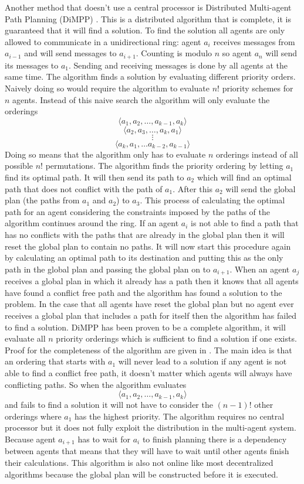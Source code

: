 Another method that doesn't use a central processor is Distributed Multi-agent
Path Planning (DiMPP) \cite{chouhan2017}. This is a distributed algorithm that
is complete, it is guaranteed that it will find a solution. To find the
solution all agents are only allowed to communicate in a unidirectional ring:
agent $a_i$ receives messages from $a_{i-1}$ and will send messages to
$a_{i+1}$. Counting is modulo $n$ so agent $a_n$ will send its messages to
$a_1$. Sending and receiving messages is done by all agents at the same time.
The algorithm finds a solution by evaluating different priority orders. Naively
doing so would require the algorithm to evaluate $n!$ priority schemes for $n$
agents. Instead of this naive search the algorithm will only evaluate the
orderings
\[ \langle a_1, a_2, \ldots, a_{k-1}, a_k \rangle \]
\[ \langle a_2, a_3, \ldots, a_k, a_1 \rangle \]
\[ \vdots \]
\[ \langle a_k, a_1, \ldots a_{k-2}, a_{k-1} \rangle \]
Doing so means that the algorithm only has to evaluate $n$ orderings instead of
all possible $n!$ permutations. The algorithm finds the priority ordering
by letting $a_1$ find its optimal path. It will then send its path to $a_2$
which will find an optimal path that does not conflict with the path of $a_1$.
After this $a_2$ will send the global plan (the paths from $a_1$ and $a_2$) to
$a_3$. This process of calculating the optimal path for an agent considering
the constraints imposed by the paths of the algorithm continues around the
ring. If an agent $a_i$ is not able to find a path that has no conflicts with
the paths that are already in the global plan then it will reset the global
plan to contain no
paths. It will now start this procedure again by calculating an optimal path to
its destination and putting this as the only path in the global plan and
passing the global plan on to $a_{i+1}$. When an agent $a_j$ receives a global
plan in which it already has a path then it knows that all agents have found a
conflict free path and the algorithm has found a solution to the problem. In
the case that all agents have reset the global plan but no agent ever receives
a global plan that includes a path for itself then the algorithm has failed to
find a solution. DiMPP has been proven to be a complete algorithm, it will
evaluate all $n$ priority orderings which is sufficient to find a solution if
one exists. Proof for the completeness of the algorithm are given in
\cite[subsection 5.1]{chouhan2017}. The main idea is that an ordering that
starts with $a_1$ will never lead to a solution if any agent is not able to
find a conflict free path, it doesn't matter which agents will always have
conflicting paths. So when the algorithm evaluates
\[ \langle a_1, a_2, \ldots, a_{k-1}, a_k \rangle \]
and fails to find a solution it will not have to
consider the $(n-1)!$ other orderings where $a_1$ has the highest priority. The
algorithm requires no central processor but it does not fully exploit the
distribution in the multi-agent system. Because agent $a_{i+1}$ has to wait for
$a_i$ to finish planning there is a dependency between agents that means that
they will have to wait until other agents finish their calculations. This
algorithm is also not online like most decentralized algorithms because the
global plan will be constructed before it is executed.

